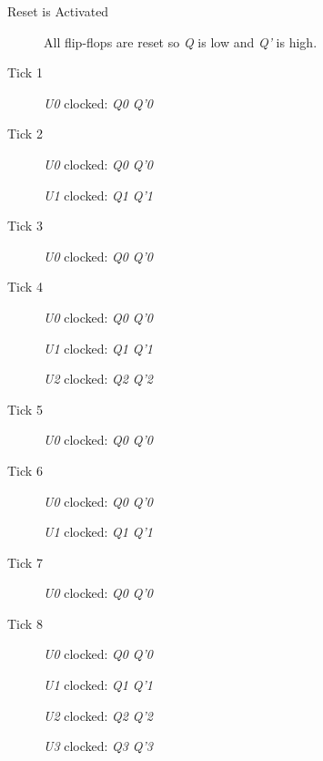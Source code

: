 \begin{description}
	\item [Reset is Activated] All flip-flops are reset so \textit{Q} is low and \textit{Q'} is high.

	\item [Tick 1] \textit{U0} clocked: \textit{Q0} \textuparrow \: \textemdash \: \textit{Q'0} \textdownarrow

	\item [Tick 2] \textit{U0} clocked: \textit{Q0} \textdownarrow \: \textemdash \: \textit{Q'0} \textuparrow
	
	\hspace{14pt}\textit{U1} clocked: \textit{Q1} \textuparrow \: \textemdash \: \textit{Q'1} \textdownarrow
	
	\item [Tick 3] \textit{U0} clocked: \textit{Q0} \textuparrow \: \textemdash \: \textit{Q'0} \textdownarrow

	\item [Tick 4] \textit{U0} clocked: \textit{Q0} \textdownarrow \: \textemdash \: \textit{Q'0} \textuparrow

	\hspace{14pt}\textit{U1} clocked: \textit{Q1} \textdownarrow \: \textemdash \: \textit{Q'1} \textuparrow

	\hspace{14pt}\textit{U2} clocked: \textit{Q2} \textuparrow \: \textemdash \: \textit{Q'2} \textdownarrow

	\item [Tick 5] \textit{U0} clocked: \textit{Q0} \textuparrow \: \textemdash \: \textit{Q'0} \textdownarrow

	\item [Tick 6] \textit{U0} clocked: \textit{Q0} \textdownarrow \: \textemdash \: \textit{Q'0} \textuparrow

	\hspace{14pt}\textit{U1} clocked: \textit{Q1} \textuparrow \: \textemdash \: \textit{Q'1} \textdownarrow
	
	\item [Tick 7] \textit{U0} clocked: \textit{Q0} \textuparrow \: \textemdash \: \textit{Q'0} \textdownarrow

	\item [Tick 8] \textit{U0} clocked: \textit{Q0} \textdownarrow \: \textemdash \: \textit{Q'0} \textuparrow

	\hspace{14pt}\textit{U1} clocked: \textit{Q1} \textdownarrow \: \textemdash \: \textit{Q'1} \textuparrow
	
	\hspace{14pt}\textit{U2} clocked: \textit{Q2} \textdownarrow \: \textemdash \: \textit{Q'2} \textuparrow

	\hspace{14pt}\textit{U3} clocked: \textit{Q3} \textuparrow \: \textemdash \: \textit{Q'3} \textdownarrow

\end{description}


